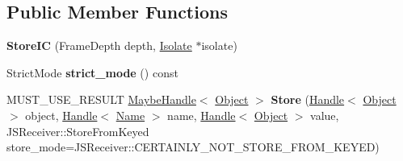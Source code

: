 \subsection*{Public Member Functions}
\begin{DoxyCompactItemize}
\item 
\hypertarget{classv8_1_1internal_1_1_store_i_c_a545ca482568108f14b88afdf7ad284c6}{}{\bfseries Store\+I\+C} (Frame\+Depth depth, \hyperlink{classv8_1_1internal_1_1_isolate}{Isolate} $\ast$isolate)\label{classv8_1_1internal_1_1_store_i_c_a545ca482568108f14b88afdf7ad284c6}

\item 
\hypertarget{classv8_1_1internal_1_1_store_i_c_a9a605ddedd7471f43cdfd667abee0f6a}{}Strict\+Mode {\bfseries strict\+\_\+mode} () const \label{classv8_1_1internal_1_1_store_i_c_a9a605ddedd7471f43cdfd667abee0f6a}

\item 
\hypertarget{classv8_1_1internal_1_1_store_i_c_ae77a6c039a31c262f3156c0d91b64b66}{}M\+U\+S\+T\+\_\+\+U\+S\+E\+\_\+\+R\+E\+S\+U\+L\+T \hyperlink{classv8_1_1internal_1_1_maybe_handle}{Maybe\+Handle}$<$ \hyperlink{classv8_1_1internal_1_1_object}{Object} $>$ {\bfseries Store} (\hyperlink{classv8_1_1internal_1_1_handle}{Handle}$<$ \hyperlink{classv8_1_1internal_1_1_object}{Object} $>$ object, \hyperlink{classv8_1_1internal_1_1_handle}{Handle}$<$ \hyperlink{classv8_1_1internal_1_1_name}{Name} $>$ name, \hyperlink{classv8_1_1internal_1_1_handle}{Handle}$<$ \hyperlink{classv8_1_1internal_1_1_object}{Object} $>$ value, J\+S\+Receiver\+::\+Store\+From\+Keyed store\+\_\+mode=J\+S\+Receiver\+::\+C\+E\+R\+T\+A\+I\+N\+L\+Y\+\_\+\+N\+O\+T\+\_\+\+S\+T\+O\+R\+E\+\_\+\+F\+R\+O\+M\+\_\+\+K\+E\+Y\+E\+D)\label{classv8_1_1internal_1_1_store_i_c_ae77a6c039a31c262f3156c0d91b64b66}

\end{DoxyCompactItemize}
